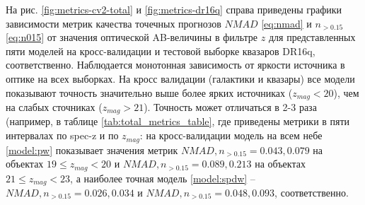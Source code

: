 \documentclass[fleqn,usenatbib]{mnras}
\begin{document}
%




На рис. \ref{fig:metrics-cv2-total} и \ref{fig:metrics-dr16q} справа приведены графики зависимости метрик качества точечных прогнозов $NMAD$ \eqref{eq:nmad} и $n_{>0.15}$ \eqref{eq:n015} от значения оптической AB-величины в фильтре $z$ для представленных пяти моделей на кросс-валидации и тестовой выборке квазаров DR16q, соответственно. Наблюдается монотонная зависимость от яркости источника в оптике на всех выборках. На кросс валидации (галактики и квазары) все модели показывают точность значительно выше более ярких источниках ($z_{mag} < 20$), чем на слабых сточниках ($z_{mag} > 21$). Точность может отличаться в 2-3 раза (например, в таблице \ref{tab:total_metrics_table}, где приведены метрики в пяти интервалах по spec-z и по $z_{mag}$: на кросс-валидации модель на всем небе \ref{model:pw} показывает значения метрик $NMAD, n_{>0.15} = 0.043, 0.079$ на объектах $19 \leq z_{mag} < 20$ и $NMAD, n_{>0.15} = 0.089, 0.213$ на объектах $21 \leq z_{mag} < 23$, а наиболее точная модель \ref{model:spdw} -- $NMAD, n_{>0.15} = 0.026, 0.034$ и $NMAD, n_{>0.15} = 0.048, 0.093$, соответственно.
\end{document}
